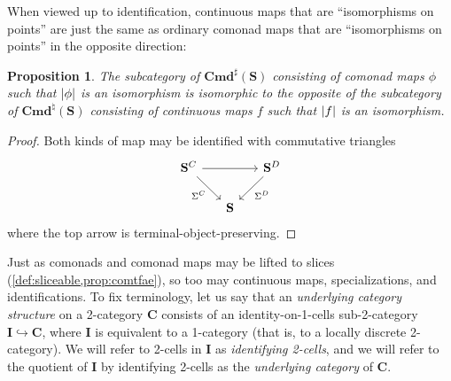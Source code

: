 \documentclass[11pt, oneside, article]{memoir}
\theoremstyle{plain}
\newtheorem{proposition}[theorem]{Proposition}
\theoremstyle{definition}
\theoremstyle{remark}
\DeclareMathOperator{\id}{id}
\DeclarePairedDelimiter{\abs}{\lvert}{\rvert}
\newcommand{\bang}{\mathrm{!}}
\newcommand{\namedcat}[1]{\mathbf{#1}}
\newcommand{\tcat}[1]{\mathbf{#1}}
\newcommand{\cat}[1]{\mathbf{#1}}
\newcommand{\Com}{\namedcat{Cmd}^\sharp}
\newcommand{\Con}{\namedcat{Cmd}^\natural}
\newcommand{\ConO}{\Con}
\newcommand{\CoalgOn}[2]{{#2}^{#1}}
\newcommand{\CoalgS}[1]{\CoalgOn{#1}{\bS}}
\newcommand{\pts}[1]{{\abs{#1}}}
\newcommand{\qpts}[1]{\pts{#1}}
\newcommand{\one}[1]{\pts{#1}}
\newcommand{\carr}{\Sigma}
\newcommand{\car}[1]{\carr^{#1}}
\newcommand{\carC}{\car{\cC}}
\newcommand{\carD}{\car{\cD}}
\newcommand{\connat}[1]{\vec{#1}}
\newcommand{\cmnd}[1]{{#1}}
\newcommand{\xX}{X}
\newcommand{\cC}{\cmnd{C}}
\newcommand{\cD}{\cmnd{D}}
\newcommand{\bS}{\cat{S}}
\newcommand{\CS}{\CoalgS{\cC}}
\newcommand{\DS}{\CoalgS{\cD}}
\newcommand{\final}{terminal-object-preserving}
\begin{document}

When viewed up to identification, continuous maps that are
``isomorphisms on points'' are just the same as ordinary comonad maps
that are ``isomorphisms on points'' in the opposite direction:

\begin{proposition}\label{prop:boo}
  The subcategory of $\Com(\bS)$ consisting of
  comonad maps $\phi$ such that $\one{\phi}$ is an isomorphism is isomorphic
  to the opposite of the subcategory of $\ConO(\bS)$ consisting of
  continuous maps $f$ such that $\one{f}$ is an isomorphism.
  
\end{proposition}
\begin{proof}
  Both kinds of map may be identified with commutative
  triangles
  \[
    \begin{tikzcd}[column sep=15pt]
      \CS && \DS \\
      & \bS
      \arrow[from=1-1, to=1-3]
      \arrow["\carC"', from=1-1, to=2-2]
      \arrow["\carD", from=1-3, to=2-2]
    \end{tikzcd}
  \]
  where the top arrow is {\final}.
\end{proof}

Just as comonads and comonad maps may be lifted to slices
(\cref{def:sliceable,prop:comtfae}), so too may continuous maps,
specializations, and identifications. To fix terminology, let us say
that an \emph{underlying category structure} on a 2-category
$\tcat{C}$ consists of an identity-on-1-cells sub-2-category
$\tcat{I} \hookrightarrow \tcat{C}$, where $\tcat{I}$ is equivalent to
a 1-category (that is, to a locally discrete 2-category).  We will
refer to 2-cells in $\tcat{I}$ as \emph{identifying 2-cells}, and we
will refer to the quotient of $\tcat{I}$ by identifying 2-cells as the
\emph{underlying category} of $\tcat{C}$.
\end{document}
